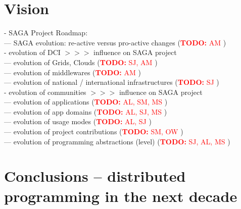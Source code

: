 \documentclass{article}
\newcommand{\B}[1]{\textbf{#1}}
\newcommand{\nind}{\noindent}
\newcommand{\todo}[1]{{\textcolor{red}{\B{TODO:} #1 }}}
\begin{document}
\section{Vision}

    \nind
    - SAGA Project Roadmap:\\
    --- SAGA evolution: re-active versus pro-active changes (\todo{AM})\\
     
  
    \nind
    - evolution of DCI $>>>$ influence on SAGA project\\
    --- evolution of Grids, Clouds (\todo{SJ, AM})\\
    --- evolution of middlewares (\todo{AM})\\
    --- evolution of national / international infrastructures (\todo{SJ})\\
  
    \nind
    - evolution of communities  $>>>$ influence on SAGA project\\
    --- evolution of applications (\todo{AL, SM, MS})\\
    --- evolution of app domains (\todo{AL, SJ, MS})\\
    --- evolution of usage modes (\todo{AL, SJ})\\
    --- evolution of project contributions (\todo{SM, OW})\\
    --- evolution of programming abstractions (level) (\todo{SJ, AL, MS})\\


\section{Conclusions -- distributed programming in the next decade}

\footnotesize


\end{document}
